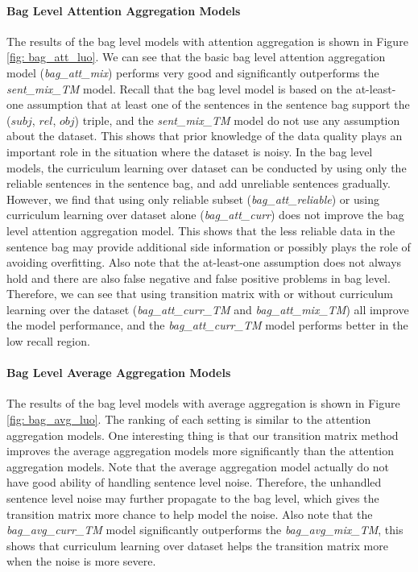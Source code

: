 \paragraph{Bag Level Attention Aggregation Models}
The results of the bag level models with attention aggregation is shown in Figure \ref{fig: bag_att_luo}. We can see that the basic bag level attention aggregation model (\emph{bag\_att\_mix}) performs very good and significantly outperforms the \emph{sent\_mix\_TM} model. Recall that the bag level model is based on the at-least-one assumption that at least one of the sentences in the sentence bag support the ($subj$, $rel$, $obj$) triple, and the \emph{sent\_mix\_TM} model do not use any assumption about the dataset. This shows that prior knowledge of the data quality plays an important role in the situation where the dataset is noisy. In the bag level models, the curriculum learning over dataset can be conducted by using only the reliable sentences in the sentence bag, and add unreliable sentences gradually. However, we find that using only reliable subset (\emph{bag\_att\_reliable}) or using curriculum learning over dataset alone (\emph{bag\_att\_curr}) does not improve the bag level attention aggregation model. This shows that the less reliable data in the sentence bag may provide additional side information or possibly plays the role of avoiding overfitting.  Also note that the at-least-one assumption does not always hold and there are also false negative and false positive problems in bag level. Therefore, we can see that using transition matrix with or without curriculum learning over the dataset (\emph{bag\_att\_curr\_TM} and \emph{bag\_att\_mix\_TM}) all improve the model performance, and the \emph{bag\_att\_curr\_TM} model performs better in the low recall region.

\paragraph{Bag Level Average Aggregation Models}
The results of the bag level models with average aggregation is shown in Figure \ref{fig: bag_avg_luo}. The ranking of each setting is similar to the attention aggregation models. One interesting thing is that our transition matrix method improves the average aggregation models more significantly than the attention aggregation models. Note that the average aggregation model actually do not have good ability of handling sentence level noise. Therefore, the unhandled sentence level noise may further propagate to the bag level, which gives the transition matrix more chance to help model the noise. Also note that the \emph{bag\_avg\_curr\_TM} model significantly outperforms the \emph{bag\_avg\_mix\_TM}, this shows that curriculum learning over dataset helps the transition matrix more when the noise is more severe.

